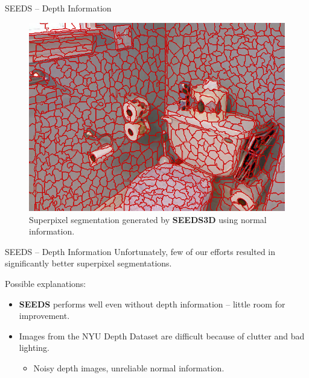 \documentclass[handout]{beamer}
\begin{document}
	\begin{frame}{SEEDS -- Depth Information}
		\begin{figure}
   			\centering
   			\includegraphics[scale=0.33]{images/nyu-3-seeds3dn}
   			\caption{Superpixel segmentation generated by \textbf{SEEDS3D} using normal information.}
   		\end{figure}
	\end{frame}
	
	\begin{frame}{SEEDS -- Depth Information}
		Unfortunately, few of our efforts resulted in significantly better superpixel segmentations.
		\vskip 0.5cm
		
		Possible explanations:
		\vskip 0.25cm
		\begin{itemize}[label=--]
			\item \textbf{SEEDS} performs well even without depth information -- little room for improvement.
			\pause
			
			\item Images from the NYU Depth Dataset \cite{SilbermanHoiemKohliFergus:2012} are difficult because of clutter and bad lighting.
			\begin{itemize}[label=$\rightarrow$]
				\item Noisy depth images, unreliable normal information.
			\end{itemize}
		\end{itemize}
	\end{frame}
	
\end{document}
